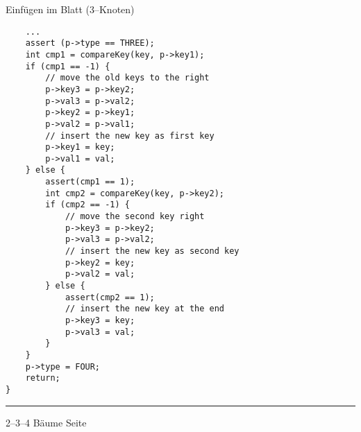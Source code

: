 
\begin{slide}{}
\normalsize

\begin{center}
Einf\"ugen im Blatt (3--Knoten)
\end{center}
\vspace*{0.5cm}

\footnotesize
\begin{verbatim}
    ...
    assert (p->type == THREE);
    int cmp1 = compareKey(key, p->key1);
    if (cmp1 == -1) {
        // move the old keys to the right
        p->key3 = p->key2;
        p->val3 = p->val2;
        p->key2 = p->key1;
        p->val2 = p->val1;
        // insert the new key as first key
        p->key1 = key;
        p->val1 = val;
    } else {
        assert(cmp1 == 1);
        int cmp2 = compareKey(key, p->key2);
        if (cmp2 == -1) {
            // move the second key right
            p->key3 = p->key2;
            p->val3 = p->val2;
            // insert the new key as second key
            p->key2 = key;
            p->val2 = val;
        } else {
            assert(cmp2 == 1);
            // insert the new key at the end
            p->key3 = key;
            p->val3 = val;
        }
    }
    p->type = FOUR;
    return;
}
\end{verbatim}


\vspace*{\fill}
\tiny \addtocounter{mypage}{1}
\rule{17cm}{1mm}
2--3--4 B\"aume  \hspace*{\fill} Seite 
\end{slide}


